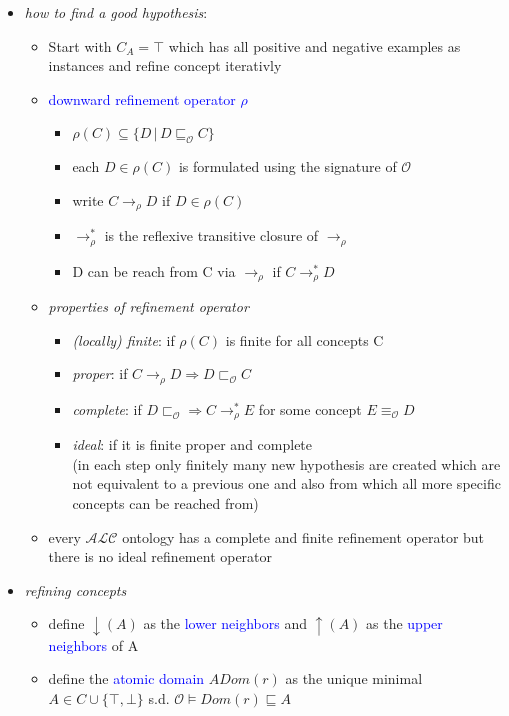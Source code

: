 \documentclass[12pt,a4paper]{article}
\newcommand{\blue}[1]{\textcolor{blue} {#1}}
\newcommand{\ont}{\mathcal{O}}
\newcommand{\sse}{\sqsubseteq}
\begin{document}
\begin{itemize}
\begin{itemize}
\begin{itemize}
\end{itemize}
\item \textit{how to find a good hypothesis}:
\begin{itemize}
\item Start with $C_A = \top$ which has all positive and negative examples as instances and refine concept iterativly
\item \blue{downward refinement operator $\rho$}
\begin{itemize}
\item $\rho(C) \subseteq \{D\,|\, D \sse_\ont C\}$
\item each $D\in \rho(C)$ is formulated using the signature of $\ont$
\item write $C \rightarrow_\rho D$ if $D\in \rho(C)$
\item $\rightarrow_\rho^*$ is the reflexive transitive closure of $\rightarrow_\rho$
\item D can be reach from C via $\rightarrow_\rho$ if $C\rightarrow_\rho^* D$
\end{itemize}
\item \textit{properties of refinement operator}
\begin{itemize}
\item \textit{(locally) finite}: if $\rho(C)$ is finite for all concepts C
\item \textit{proper}: if $C\rightarrow_\rho D \Rightarrow D \sqsubset_\ont C$
\item \textit{complete}: if $D \sqsubset_\ont \Rightarrow C \rightarrow_\rho^* E$ for some concept $E \equiv_\ont D$
\item \textit{ideal}: if it is finite proper and complete\\
(in each step only finitely many new hypothesis are created which are not equivalent to a previous one and also from which all more specific concepts can be reached from)
\end{itemize}
\item every $\mathcal{ALC}$ ontology has a complete and finite refinement operator but there is no ideal refinement operator
\end{itemize}
\item \textit{refining concepts}
\begin{itemize}
\item define $\downarrow(A)$ as the \blue{lower neighbors} and $\uparrow(A)$ as the \blue{upper neighbors} of A
\item define the \blue{atomic domain} $ADom(r)$ as the unique minimal $A\in C\cup \{\top,\bot\}$ s.d. $\ont \models Dom(r) \sse A$

\end{itemize}
\end{itemize}
\end{itemize}
\end{document}
